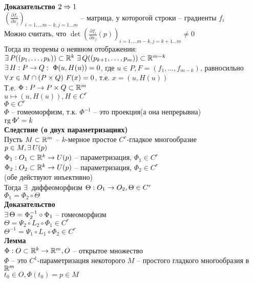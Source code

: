 \documentclass[12pt]{article}
\newcommand{\ppart}[2]{\frac{\partial #1}{\partial #2}}
\begin{document}
\textbf{Доказательство $2 \Rightarrow 1$}\\
$(\ppart{f_i}{x_j})_{i=1,\ldots m-k, j=1\ldots m}$ -- матрица, у которогой строки -- градиенты $f_i$\\
Можно считать, что $\det(\ppart{f_i}{x_j}(p))_{i=1,\ldots m-k, j={k+1}\ldots m} \neq 0$\\
Тогда из теоремы о неявном отображении:\\
$\exists\, P((p_1,\ldots, p_k)) \subset \mathbb{R}^k\ \exists\, Q((p_{k+1}, \ldots, p_m))\subset \mathbb{R}^{m-k}$\\
$\exists\, H: P \rightarrow Q:\ \Phi(u, H(u)) = 0$, где $u \in P, F=(f_1,\ldots, f_{m-k})$, равносильно $\fall x \in M\cap (P\times Q)\ F(x)=0$, т.е. $x=(u, H(u))$\\
Т.е. $\Phi: P\rightarrow P\times Q \subset \mathbb{R}^m$\\
$u\mapsto (u, H(u)), H\in C^r$\\
$\Phi \in C^r$\\
$\Phi$ -- гомеоморфизм, т.к. $\Phi^{-1}$ -- это проекция(а она непрерывна)\\
$\operatorname{rg} \Phi' = k$\\
\textbf{Следствие (о двух параметризациях)}\\
Пусть $M \subset \mathbb{R}^m$ -- $k$-мерное простое $C^r$-гладкое многообразие\\
$p\in M, \exists\, U(p)$\\
$\Phi_1: O_1\subset \mathbb{R}^k \rightarrow U(p)$ -- параметризация, $\Phi_1 \in C^r$\\
$\Phi_2: O_2\subset \mathbb{R}^k \rightarrow U(p)$ -- параметризация, $\Phi_2 \in C^r$\\
(обе действуют инъективно)\\
Тогда $\exists\,$ диффеоморфизм $\Theta: O_1 \rightarrow O_2, \Theta \in C^r$\\
$\Phi_1 = \Phi_2\circ \Theta$\\
\textbf{Доказательство}\\
$\exists\, \Theta = \Phi_2^{-1}\circ \Phi_1$ -- гомеоморфизм\\
$\Theta=\Psi_2\circ L_2\circ \Phi_1\in C^r$\\
$\Theta^{-1} = \Psi_1 \circ L_1 \circ \Phi_2 \in C^r$\\
\textbf{Лемма}\\
$\Phi: O\subset \mathbb{R}^k \rightarrow \mathbb{R}^m, O$ -- открытое множество\\
$\Phi$ -- это $C^1$-параметризация некоторого $M$ -- простого гладкого многообразия в $\mathbb{R}^m$\\
$t_0 \in O, \Phi(t_0) = p\in M$\\
\end{document}
